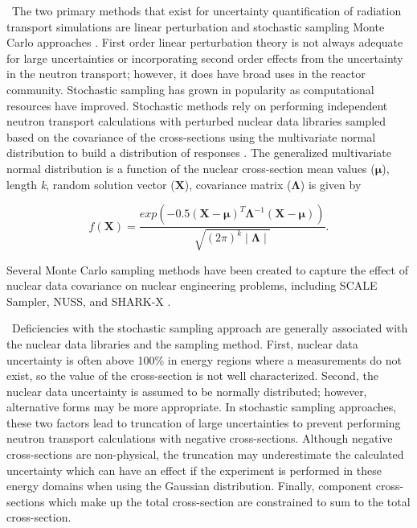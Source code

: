 \ The two primary methods that exist for uncertainty quantification of radiation transport simulations are linear perturbation and stochastic sampling Monte Carlo approaches \cite{Rochman2011}. 
First order linear perturbation theory is not always adequate for large uncertainties or incorporating second order effects from the uncertainty in the neutron transport; however, it does have broad uses in the reactor community.
Stochastic sampling has grown in popularity as computational resources have improved. 
Stochastic methods rely on performing independent neutron transport calculations with perturbed nuclear data libraries sampled based on the covariance of the cross-sections using the multivariate normal distribution to build a distribution of responses \cite{Aures2017}. 
The generalized multivariate normal distribution is a function of the nuclear cross-section mean values ($\boldsymbol{\mu}$), length \textit{k}, random solution vector ($\boldsymbol{X}$), covariance matrix ($\boldsymbol{\Lambda}$) is given by

\begin{equation} \label{eq:Cov4}
f(\boldsymbol{X}) = \dfrac{exp(-0.5(\mathbf{X}-\boldsymbol{\mu})^{T}\mathbf{\Lambda}^{-1}(\mathbf{X}-\boldsymbol{\mu}))}{\sqrt{(2\pi)^{k}\mid \mathbf{\Lambda} \mid}}.
\end{equation}

\noindent Several Monte Carlo sampling methods have been created to capture the effect of nuclear data covariance on nuclear engineering problems, including SCALE Sampler, NUSS, and SHARK-X \cite{Diez2015, Zhu2015a, SCALE, Aures2017}.  

\ Deficiencies with the stochastic sampling approach are generally associated with the nuclear data libraries and the sampling method. 
First, nuclear data uncertainty is often above 100\% in energy regions where a measurements do not exist, so the value of the cross-section is not well characterized. 
Second, the nuclear data uncertainty is assumed to be normally distributed; however, alternative forms may be more appropriate. 
In stochastic sampling approaches, these two factors lead to truncation of large uncertainties to prevent performing neutron transport calculations with negative cross-sections. 
Although negative cross-sections are non-physical, the truncation may underestimate the calculated uncertainty which can have an effect if the experiment is performed in these energy domains when using the Gaussian distribution. 
Finally, component cross-sections which make up the total cross-section are constrained to sum to the total cross-section. 


